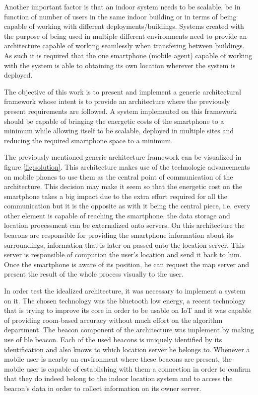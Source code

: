 Another important factor is that an indoor system needs to be scalable, be in function of number of users in the same indoor building or in terms of being capable of working with different deployments/buildings. Systems created with the purpose of being used in multiple different environments need to provide an architecture capable of working seamlessly when transfering between buildings. As such it is required that the one smartphone (mobile agent) capable of working with the system is able to obtaining its own location wherever the system is deployed.  

The objective of this work is to present and implement a generic architectural framework whose intent is to provide an architecture where the previously present requirements are followed. A system implemented on this framework should be capable of bringing the energetic costs of the smartphone to a minimum while allowing itself to be scalable, deployed in multiple sites and reducing the required smartphone space to a minimum.

The previously mentioned generic architecture framework can be visualized in figure \ref{fig:solution}. This architecture makes use of the technologic advancements on mobile phones to use them as the central point of communication of the architecture. This decision may make it seem so that the energetic cost on the smartphone takes a big impact due to the extra effort required for all the communication but it is the opposite as with it being the central piece, i.e. every other element is capable of reaching the smartphone, the data storage and location processment can be externalized onto servers. On this architecture the beacons are responsible for providing the smartphone information about its surroundings, information that is later on passed onto the location server. This server is responsible of compution the user's location and send it back to him. Once the smartphone is aware of its position, he can request the map server and present the result of the whole process visually to the user.

In order test the idealized architecture, it was necessary to implement a system on it. The chosen technology was the bluetooth low energy, a recent technology that is trying to improve its core in order to be usable on \ac{IoT} and it was capable of providing room-based accuracy without much effort on the algorithm department. The beacon component of the architecture was implement by making use of ble beacon. Each of the used beacons is uniquely identified by its identification and also knows to which location server he belongs to. Whenever a mobile user is nearby an environment where these beacons are present, the mobile user is capable of establishing with them a connection in order to confirm that they do indeed belong to the indoor location system and to access the beacon's data in order to collect information on its owner server.

